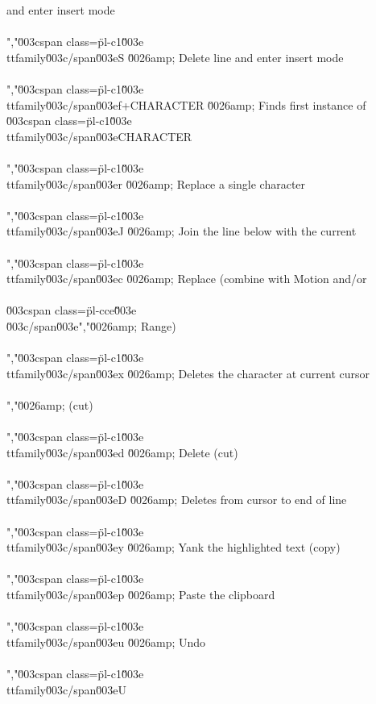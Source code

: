 and enter insert mode\\\\","\u003cspan class=\"pl-c1\"\u003e\\ttfamily\u003c/span\u003e{S} \u0026amp; Delete line and enter insert mode\\\\","\u003cspan class=\"pl-c1\"\u003e\\ttfamily\u003c/span\u003e{f+CHARACTER} \u0026amp; Finds first instance of \u003cspan class=\"pl-c1\"\u003e\\ttfamily\u003c/span\u003e{CHARACTER}\\\\","\u003cspan class=\"pl-c1\"\u003e\\ttfamily\u003c/span\u003e{r} \u0026amp; Replace a single character\\\\","\u003cspan class=\"pl-c1\"\u003e\\ttfamily\u003c/span\u003e{J} \u0026amp; Join the line below with the current\\\\","\u003cspan class=\"pl-c1\"\u003e\\ttfamily\u003c/span\u003e{c} \u0026amp; Replace (combine with Motion and/or\\\\\u003cspan class=\"pl-cce\"\u003e\\\u003c/span\u003e","\u0026amp; Range)\\\\","\u003cspan class=\"pl-c1\"\u003e\\ttfamily\u003c/span\u003e{x} \u0026amp; Deletes the character at current cursor\\\\","\u0026amp; (cut)\\\\","\u003cspan class=\"pl-c1\"\u003e\\ttfamily\u003c/span\u003e{d} \u0026amp; Delete (cut)\\\\","\u003cspan class=\"pl-c1\"\u003e\\ttfamily\u003c/span\u003e{D} \u0026amp; Deletes from cursor to end of line\\\\","\u003cspan class=\"pl-c1\"\u003e\\ttfamily\u003c/span\u003e{y} \u0026amp; Yank the highlighted text (copy)\\\\","\u003cspan class=\"pl-c1\"\u003e\\ttfamily\u003c/span\u003e{p} \u0026amp; Paste the clipboard\\\\","\u003cspan class=\"pl-c1\"\u003e\\ttfamily\u003c/span\u003e{u} \u0026amp; Undo\\\\","\u003cspan class=\"pl-c1\"\u003e\\ttfamily\u003c/span\u003e{U} 